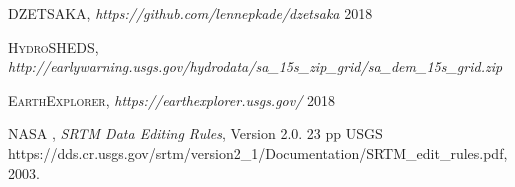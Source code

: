 \begin{thebibliography}{9}
 \textsc{DZETSAKA}, \textit{https://github.com/lennepkade/dzetsaka} 2018

 \textsc{HydroSHEDS}, \textit{http://earlywarning.usgs.gov/hydrodata/sa\_15s\_zip\_grid/sa\_dem\_15s\_grid.zip}

 \textsc{EarthExplorer}, \textit{https://earthexplorer.usgs.gov/} 2018

 \textsc{NASA} , \textit{SRTM Data Editing Rules}, Version 2.0. 23 pp USGS \\https://dds.cr.usgs.gov/srtm/version2\_1/Documentation/SRTM\_edit\_rules.pdf, 2003.


\end{thebibliography}
